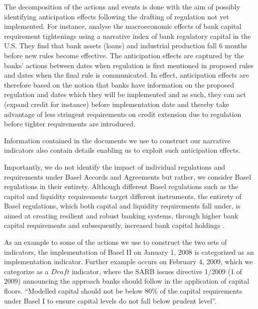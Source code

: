 \documentclass[
  letterpaper,
  DIV=11,
  numbers=noendperiod]{scrartcl}
\begin{document}
The decomposition of the actions and events is done with the aim of
possibly identifying anticipation effects following the drafting of
regulation not yet implemented. For instance,
\cite{eickmeier2018macroeconomic} analyse the macroeconomic effects of
bank capital requirement tightenings using a narrative index of bank
regulatory capital in the U.S. They find that bank assets (loans) and
industrial production fall 6 months before new rules become effective.
The anticipation effects are captured by the banks' actions between
dates when regulation is first mentioned in proposed rules and dates
when the final rule is communicated. In effect, anticipation effects are
therefore based on the notion that banks have information on the
proposed regulation and dates which they will be implemented and as
such, they can act (expand credit for instance) before implementation
date and thereby take advantage of less stringent requirements on credit
extension due to regulation before tighter requirements are introduced.

Information contained in the documents we use to construct our narrative
indicators also contain details enabling us to exploit such anticipation
effects.

Importantly, we do not identify the impact of individual regulations and
requirements under Basel Accords and Agreements but rather, we consider
Basel regulations in their entirety. Although different Basel
regulations such as the capital and liquidity requirements target
different instruments, the entirety of Basel regulations, which both
capital and liquidity requirements fall under, is aimed at creating
resilient and robust banking systems, through higher bank capital
requirements and subsequently, increased bank capital holdings
\citep{cohen2016banks} \citep{cerutti2018changes}.

As an example to some of the actions we use to construct the two sets of
indicators, the implementation of Basel II on January 1, 2008 is
categorized as an implementation indicator. Further example occurs on
February 4, 2009, which we categorize as a \(Draft\) indicator, where
the SARB issues directive 1/2009 (1 of 2009) announcing the approach
banks should follow in the application of capital floors. ``Modelled
capital should not be below 80\% of the capital requirements under Basel
I to ensure capital levels do not fall below prudent level''.
\end{document}
